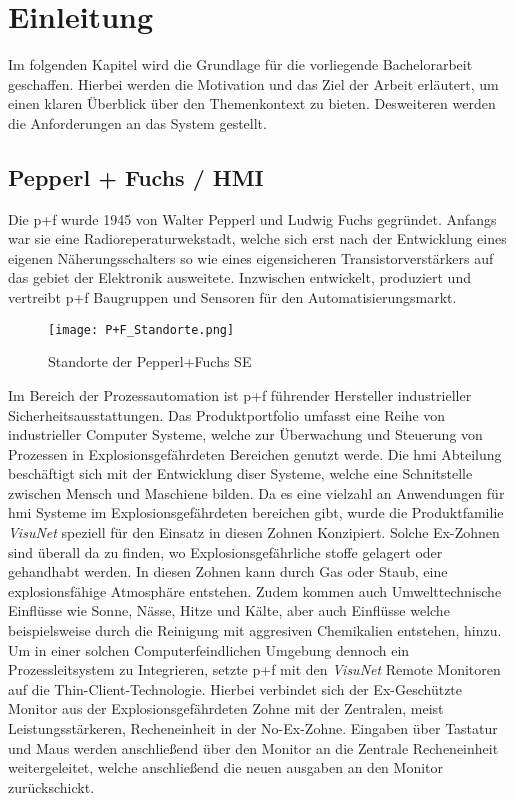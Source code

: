 \chapter{Einleitung}
\vspace{-1.2cm}
Im folgenden Kapitel wird die Grundlage für die vorliegende Bachelorarbeit geschaffen. Hierbei werden die Motivation und das Ziel der Arbeit erläutert, um einen klaren Überblick über den Themenkontext zu bieten. Desweiteren werden die Anforderungen an das System gestellt.

\section{Pepperl + Fuchs / HMI}\label{sec:PFHMI}
Die \ac{p+f} wurde 1945 von Walter Pepperl und Ludwig Fuchs gegründet. Anfangs war sie eine Radioreperaturwekstadt, welche sich erst nach der Entwicklung eines eigenen Näherungsschalters so wie eines eigensicheren Transistorverstärkers auf das gebiet der Elektronik ausweitete. Inzwischen entwickelt, produziert und vertreibt \ac{p+f} Baugruppen und Sensoren für den Automatisierungsmarkt.\\
\vspace{-1cm}
\begin{flushleft}
    \begin{figure}[h!]
        \centering
        \texttt{[image: P+F\_Standorte.png]}
        \caption{Standorte der Pepperl+Fuchs SE}
        \label{fig:StandortePF}
    \end{figure}
\end{flushleft}
Im Bereich der Prozessautomation ist \ac*{p+f} führender Hersteller industrieller Sicherheitsausstattungen. Das Produktportfolio umfasst eine Reihe von industrieller Computer Systeme, welche zur Überwachung und Steuerung von Prozessen in Explosionsgefährdeten Bereichen genutzt werde. Die \ac{hmi} Abteilung beschäftigt sich mit der Entwicklung diser Systeme, welche eine Schnitstelle zwischen Mensch und Maschiene bilden. Da es eine vielzahl an Anwendungen für \ac{hmi} Systeme im Explosionsgefährdeten bereichen gibt, wurde die Produktfamilie \textit{VisuNet} speziell für den Einsatz in diesen Zohnen Konzipiert. Solche Ex-Zohnen sind überall da zu finden, wo Explosionsgefährliche stoffe gelagert oder gehandhabt werden. In diesen Zohnen kann durch Gas oder Staub, eine explosionsfähige Atmosphäre entstehen. Zudem kommen auch Umwelttechnische Einflüsse wie Sonne, Nässe, Hitze und Kälte, aber auch Einflüsse welche beispielsweise durch die Reinigung mit aggresiven Chemikalien entstehen, hinzu. Um in einer solchen Computerfeindlichen Umgebung dennoch ein Prozessleitsystem zu Integrieren, setzte \ac{p+f} mit den \textit{VisuNet} Remote Monitoren auf die Thin-Client-Technologie. Hierbei verbindet sich der Ex-Geschützte Monitor aus der Explosionsgefährdeten Zohne mit der Zentralen, meist Leistungsstärkeren, Recheneinheit in der No-Ex-Zohne. Eingaben über Tastatur und Maus werden anschließend über den Monitor an die Zentrale Recheneinheit weitergeleitet, welche anschließend die neuen ausgaben an den Monitor zurückschickt.  

